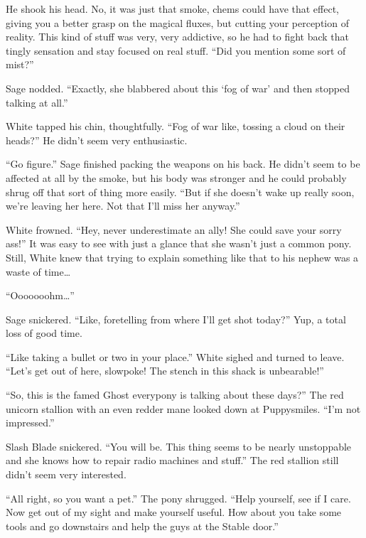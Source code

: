He shook his head. No, it was just that smoke, chems could have that effect, giving you a better grasp on the magical fluxes, but cutting your perception of reality. This kind of stuff was very, very addictive, so he had to fight back that tingly sensation and stay focused on real stuff. ``Did you mention some sort of mist?''

Sage nodded. ``Exactly, she blabbered about this `fog of war' and then stopped talking at all.''

White tapped his chin, thoughtfully. ``Fog of war like, tossing a cloud on their heads?'' He didn't seem very enthusiastic.

``Go figure.'' Sage finished packing the weapons on his back. He didn't seem to be affected at all by the smoke, but his body was stronger and he could probably shrug off that sort of thing more easily. ``But if she doesn't wake up really soon, we're leaving her here. Not that I'll miss her anyway.''

White frowned. ``Hey, never underestimate an ally! She could save your sorry ass!'' It was easy to see with just a glance that she wasn't just a common pony. Still, White knew that trying to explain something like that to his nephew was a waste of time\dots

``Ooooooohm\dots''

Sage snickered. ``Like, foretelling from where I'll get shot today?'' Yup, a total loss of good time.

``Like taking a bullet or two in your place.'' White sighed and turned to leave. ``Let's get out of here, slowpoke! The stench in this shack is unbearable!''



\horizonline


``So, this is the famed Ghost everypony is talking about these days?'' The red unicorn stallion with an even redder mane looked down at Puppysmiles. ``I'm not impressed.''

Slash Blade snickered. ``You will be. This thing seems to be nearly unstoppable and she knows how to repair radio machines and stuff.'' The red stallion still didn't seem very interested.

``All right, so you want a pet.'' The pony shrugged. ``Help yourself, see if I care. Now get out of my sight and make yourself useful. How about you take some tools and go downstairs and help the guys at the Stable door.''


